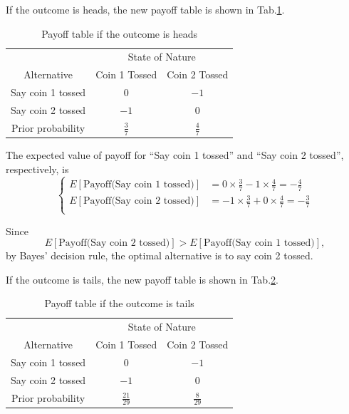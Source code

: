 \documentclass[a4paper]{article}
\begin{document}
\begin{enumerate}
\begin{enumerate}
\begin{solution}
\hspace*{4ex} If the outcome is heads, the new payoff table is shown in Tab.\ref{tabheads}.
\begin{table}[h]
  	\centering
  	\caption{Payoff table if the outcome is heads}
  	\label{tabheads}
  	\begin{tabular}{ccc}
  		\toprule[1.5pt]
  		&\multicolumn{2}{c}{State of Nature}\\
  		\cmidrule{2-3}  		
  		Alternative &Coin 1 Tossed&Coin 2 Tossed\\
  		\midrule
		Say coin 1 tossed&0&$-1$\\
		Say coin 2 tossed&$-1$&0\\
		\midrule
		Prior probability&$\frac{3}{7}$&$\frac{4}{7}$\\
  		\bottomrule[1.5pt]
  	\end{tabular}
  \end{table}
  
  \hspace{4ex} The expected value of payoff for ``Say coin 1 tossed'' and ``Say coin 2 tossed'', respectively, is
\begin{equation*}\left\{
\begin{aligned}
E[\text{Payoff(Say coin 1 tossed)}]&=0\times\frac{3}{7}-1\times\frac{4}{7}=-\frac{4}{7}\\
E[\text{Payoff(Say coin 2 tossed)}]&=-1\times\frac{3}{7}+0\times\frac{4}{7}=-\frac{3}{7}\\
\end{aligned}\right.
\end{equation*}

Since
$$
E[\text{Payoff(Say coin 2 tossed)}]>E[\text{Payoff(Say coin 1 tossed)}],
$$
by Bayes' decision rule, the optimal alternative is to say coin 2 tossed.

\vspace{0.5em}
\hspace*{4ex} If the outcome is tails, the new payoff table is shown in Tab.\ref{tabtails}.
\begin{table}[H]
  	\centering
  	\caption{Payoff table if the outcome is tails}
  	\label{tabtails}
  	\begin{tabular}{ccc}
  		\toprule[1.5pt]
  		&\multicolumn{2}{c}{State of Nature}\\
  		\cmidrule{2-3}  		
  		Alternative &Coin 1 Tossed&Coin 2 Tossed\\
  		\midrule
		Say coin 1 tossed&0&$-1$\\
		Say coin 2 tossed&$-1$&0\\
		\midrule
		Prior probability&$\frac{21}{29}$&$\frac{8}{29}$\\
  		\bottomrule[1.5pt]
  	\end{tabular}
  \end{table}
  

\end{solution}
\end{enumerate}
\end{enumerate}
\end{document}

